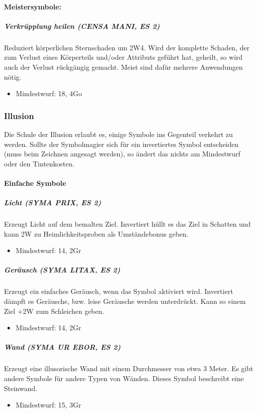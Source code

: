\documentclass{article}
\begin{document}
\paragraph{Meistersymbole:}

\subparagraph{Verkrüpplung heilen (CENSA MANI, ES 2)}
Reduziert körperlichen Sternschaden um 2W4. Wird der komplette Schaden, der zum Verlust eines Körperteils und/oder Attributs geführt hat, geheilt, so wird auch der Verlust rückgängig gemacht. Meist sind dafür mehrere Anwendungen nötig.
\begin{itemize}
\item Mindestwurf: 18, 4Go
\end{itemize}

\subsubsection{Illusion}
Die Schule der Illusion erlaubt es, einige Symbole ins Gegenteil verkehrt zu werden. Sollte der Symbolmagier sich für ein invertiertes Symbol entscheiden (muss beim Zeichnen angesagt werden), so ändert das nichts am Mindestwurf oder den Tintenkosten.

\paragraph{Einfache Symbole}

\subparagraph{Licht (SYMA PRIX, ES 2)}
Erzeugt Licht auf dem bemalten Ziel. Invertiert hüllt es das Ziel in Schatten und kann 2W zu Heimlichkeitsproben als Umständebonus geben.
\begin{itemize}
\item Mindestwurf: 14, 2Gr
\end{itemize}

\subparagraph{Geräusch (SYMA LITAX, ES 2)}
Erzeugt ein einfaches Geräusch, wenn das Symbol aktiviert wird. Invertiert dämpft es Geräusche, bzw. leise Geräusche werden unterdrückt. Kann so einem Ziel +2W zum Schleichen geben.
\begin{itemize}
\item Mindestwurf: 14, 2Gr
\end{itemize}

\subparagraph{Wand (SYMA UR EBOR, ES 2)}
Erzeugt eine illusorische Wand mit einem Durchmesser von etwa 3 Meter. Es gibt andere Symbole für andere Typen von Wänden. Dieses Symbol beschreibt eine Steinwand.
\begin{itemize}
\item Mindestwurf: 15, 3Gr
\end{itemize}
\end{document}
